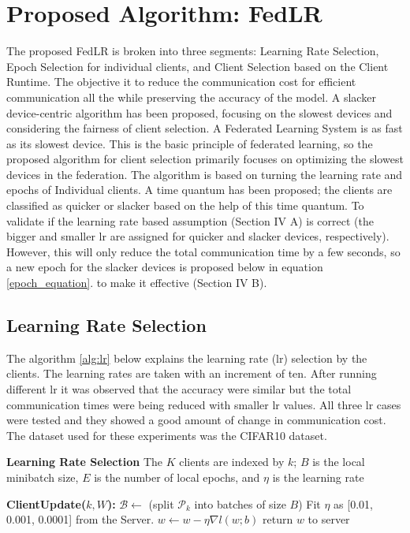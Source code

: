 \documentclass[conference]{IEEEtran}
\begin{document}
\section{Proposed Algorithm: FedLR}
The proposed FedLR is broken into three segments: Learning Rate Selection, Epoch Selection for individual clients, and Client Selection based on the Client Runtime. The objective it to reduce the communication cost for efficient communication all the while preserving the accuracy of the model. A slacker device-centric algorithm has been proposed, focusing on the slowest devices and considering the fairness of client selection. A Federated Learning System is as fast as its slowest device. This is the basic principle of federated learning, so the proposed algorithm for client selection primarily focuses on optimizing the slowest devices in the federation. The algorithm is based on turning the learning rate and epochs of Individual clients. A time quantum has been proposed; the clients are classified as quicker or slacker based on the help of this time quantum. To validate if the learning rate based assumption (Section IV A) is correct (the bigger and smaller lr are assigned for quicker and slacker devices, respectively). However, this will only reduce the total communication time by a few seconds, so a new epoch for the slacker devices is proposed below in equation \ref{epoch_equation}. to make it effective (Section IV B).
 \subsection{Learning Rate Selection}
The algorithm \ref{alg:lr} below explains the learning rate (lr) selection by the clients. The learning rates are taken with an increment of ten. After running different lr it was observed that the accuracy were similar but the total communication times were being reduced with smaller lr values. All three lr cases were tested and they showed a good amount of change in communication cost. The dataset used for these experiments was the CIFAR10 dataset.

 
 \begin{algorithm}
 	\scriptsize
 	\caption{ \textbf{Learning Rate Selection} The $K$ clients are
 		indexed by $k$; $B$ is the local minibatch size, $E$ is the number
 		of local epochs, and $\eta$ is the learning rate}\label{alg:lr}
 	\begin{algorithmic}[1]
 		
 		
 		\State \textbf{ClientUpdate($k,W$):} 
 		\State $\mathcal{B} \gets$ (split $\mathcal{P}_k$ into batches of size $B$)
 		\State Fit $\eta$ as [0.01, 0.001, 0.0001] from the Server.
 		\State $w \gets w - \eta \nabla l(w;b)$
 		\EndFor
 		\EndFor
 		\State return $w$ to server
 		
 	\end{algorithmic}
 \end{algorithm}
 
\end{document}
